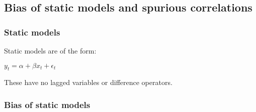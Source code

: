 \subsection{Bias of static models and spurious correlations}
\subsubsection{Static models}

Static models are of the form:

\(y_{t}=\alpha+\beta x_{t}+\epsilon_{t}\)

These have no lagged variables or difference operators.

\subsubsection{Bias of static models}


